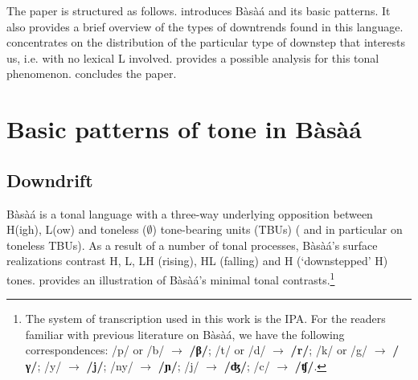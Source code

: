 \documentclass[output=paper,newtxmath,modfonts,nonflat,hidelinks]{langsci/langscibook}
\begin{document}
The paper is structured as follows.  introduces Bàsà{á} and its basic  patterns. It also provides a brief overview of the types of downtrends found in this  language.  concentrates on the distribution of the particular type of downstep that interests us, i.e. with no lexical L  involved.  provides a possible analysis for this tonal phenomenon.  concludes the paper.



\section{Basic patterns of tone in Bàsà{á}}\label{sec:HamlaouiMakasso:2} 
\subsection{Downdrift}
Bàsà{á} is a tonal language with a three-way underlying opposition between H(igh), L(ow) and toneless ($\emptyset$) tone-bearing units (TBUs) (\citealt{Dimmendaal88,Hyman03,Makasso08a} and in particular \citealt{Kody93,HamlaouiEtAl14,MakassoEtAl17} on toneless TBUs). As a result of a number of tonal processes, Bàsà{á}'s surface realizations contrast H, L, LH (rising), HL (falling) and {\textdownstep}H (`downstepped' H) tones.  provides an illustration of Bàsà{á}'s minimal tonal contrasts.\footnote{The system of transcription used in this work is the IPA. For the readers familiar with previous literature on Bàsà{á}, we have the following correspondences: /p/ or /b/ $\to$ \textbf{/β/}; /t/ or /d/ $\to$ \textbf{/r/}; /k/ or /g/ $\to$ \textbf{/γ/}; /y/ $\to$ \textbf{/j/}; /ny/ $\to$ \textbf{/ɲ/}; /j/ $\to$ \textbf{/ʤ/}; /c/ $\to$ \textbf{/ʧ/}.} 


%
%
\end{document}
